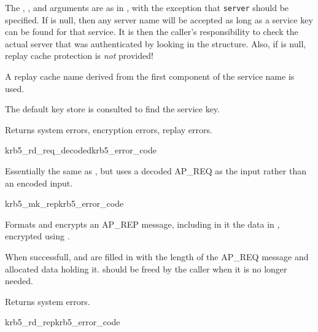 The , ,  and
 arguments are as in , with
the exception that {\tt server} should be specified.  If
 is null, then any server name will be accepted as
long as a service key can be found for that service.  It is then the
caller's responsibility to check the actual server that was
authenticated by looking in the  structure.  Also,
if
 is null, replay cache protection is {\em not}
provided!  

A replay cache name derived from the first component of the service
name is used.

The default key store is consulted to find the service key.

Returns system errors, encryption errors, replay errors.


\begin{funcdecl}{krb5_rd_req_decoded}{krb5_error_code}{\funcin}
\funcendfuncarg
{}
\funcout
{}
\end{funcdecl}

Essentially the same as , but uses a decoded AP_REQ
as the input rather than an encoded input.

\begin{funcdecl}{krb5_mk_rep}{krb5_error_code}{\funcin}
\funcout
{}
\end{funcdecl}

Formats and encrypts an AP_REP message, including in it the data in
, encrypted using .

When successfull,  and
 are filled in with the length of the
AP_REQ message and allocated data holding it.
 should be freed by the
caller when it is no longer needed.

Returns system errors.

\begin{funcdecl}{krb5_rd_rep}{krb5_error_code}{\funcin}
\funcout
{}
\end{funcdecl}

